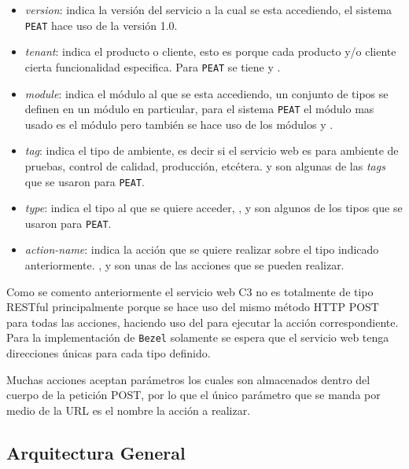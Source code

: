 \begin{itemize}
\item \textit{version}: indica la versión del servicio a la cual se esta accediendo,
  el sistema \texttt{PEAT} hace uso de la versión 1.0.
\item \textit{tenant}: indica el producto o cliente, esto es porque cada
  producto y/o cliente cierta funcionalidad especifica. Para \texttt{PEAT} se tiene
   y .
\item \textit{module}: indica el módulo al que se esta accediendo, un conjunto
  de tipos se definen en un módulo en particular, para el sistema \texttt{PEAT} el
  módulo mas usado es el módulo  pero también se hace uso
  de los módulos  y .
\item \textit{tag}: indica el tipo de ambiente, es decir si el servicio web es para
  ambiente de pruebas, control de calidad, producción, etcétera.
   y  son algunas de las \textit{tags}
  que se usaron para \texttt{PEAT}.
\item \textit{type}: indica el tipo al que se quiere acceder, ,
   y  son algunos
  de los tipos que se usaron para \texttt{PEAT}.
\item \textit{action-name}: indica la acción que se quiere realizar sobre
  el tipo indicado anteriormente. ,  y
   son unas de las acciones que se pueden realizar.
\end{itemize}

Como se comento anteriormente el servicio web C3 no es totalmente de tipo RESTful
principalmente porque se hace uso del mismo método HTTP POST para todas las acciones,
haciendo uso del  para ejecutar la acción correspondiente.
Para la implementación de \texttt{Bezel} solamente se espera que el servicio web
tenga direcciones únicas para cada tipo definido.

Muchas acciones aceptan parámetros los cuales son almacenados dentro del cuerpo
de la petición POST, por lo que el único parámetro que se manda por medio
de la URL es el nombre la acción a realizar.

\subsection{Arquitectura General}

